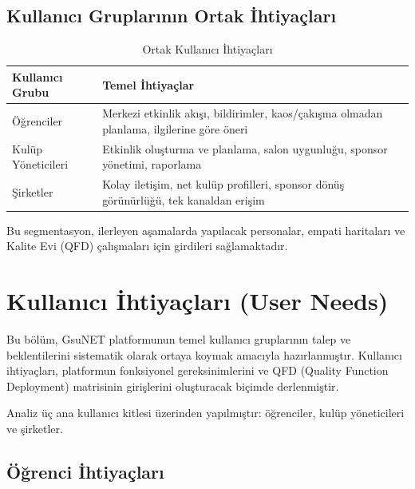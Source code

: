 \documentclass[a4paper,12pt]{report}
\begin{document}
\subsection{Kullanıcı Gruplarının Ortak İhtiyaçları}

\begin{table}[h]
\centering
\small
\begin{tabular}{|p{4cm}|p{10cm}|}
\hline
\textbf{Kullanıcı Grubu} & \textbf{Temel İhtiyaçlar} \\
\hline
Öğrenciler & Merkezi etkinlik akışı, bildirimler, kaos/çakışma olmadan planlama, ilgilerine göre öneri \\
\hline
Kulüp Yöneticileri & Etkinlik oluşturma ve planlama, salon uygunluğu, sponsor yönetimi, raporlama \\
\hline
Şirketler & Kolay iletişim, net kulüp profilleri, sponsor dönüş görünürlüğü, tek kanaldan erişim \\
\hline
\end{tabular}
\caption{Ortak Kullanıcı İhtiyaçları}
\end{table}

Bu segmentasyon, ilerleyen aşamalarda yapılacak personalar, empati haritaları ve Kalite Evi (QFD) çalışmaları için girdileri sağlamaktadır.

\section{Kullanıcı İhtiyaçları (User Needs)}

Bu bölüm, GsuNET platformunun temel kullanıcı gruplarının talep ve beklentilerini sistematik olarak ortaya koymak amacıyla hazırlanmıştır. Kullanıcı ihtiyaçları, platformun fonksiyonel gereksinimlerini ve QFD (Quality Function Deployment) matrisinin girişlerini oluşturacak biçimde derlenmiştir.

Analiz üç ana kullanıcı kitlesi üzerinden yapılmıştır: öğrenciler, kulüp yöneticileri ve şirketler.

\subsection{Öğrenci İhtiyaçları}
\end{document}
